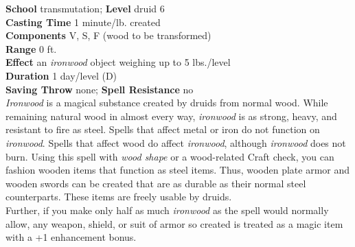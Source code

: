 \textbf{School} transmutation; \textbf{Level} druid 6\\
\textbf{Casting Time} 1 minute/lb. created\\
\textbf{Components} V, S, F (wood to be transformed)\\
\textbf{Range} 0 ft.\\
\textbf{Effect} an \textit{ironwood }object weighing up to 5 lbs./level\\
\textbf{Duration} 1 day/level (D)\\
\textbf{Saving Throw} none; \textbf{Spell Resistance} no\\
\textit{Ironwood }is a magical substance created by druids from normal wood. While remaining natural wood in almost every way, \textit{ironwood }is as strong, heavy, and resistant to fire as steel. Spells that affect metal or iron do not function on \textit{ironwood}. Spells that affect wood do affect \textit{ironwood}, although \textit{ironwood }does not burn. Using this spell with \textit{wood shape }or a wood-related Craft check, you can fashion wooden items that function as steel items. Thus, wooden plate armor and wooden swords can be created that are as durable as their normal steel counterparts. These items are freely usable by druids.\\
Further, if you make only half as much \textit{ironwood }as the spell would normally allow, any weapon, shield, or suit of armor so created is treated as a magic item with a +1 enhancement bonus.\\

